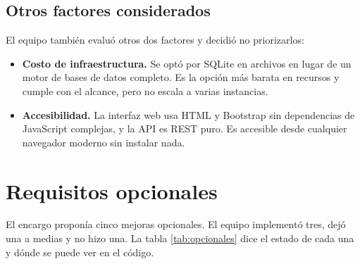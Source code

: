 \documentclass[12pt, a4paper]{article}
\begin{document}
\subsection{Otros factores considerados}

El equipo también evaluó otros dos factores y decidió no priorizarlos:

\begin{itemize}[leftmargin=1.4cm]
    \item \textbf{Costo de infraestructura.} Se optó por SQLite en
    archivos en lugar de un motor de bases de datos completo. Es la opción
    más barata en recursos y cumple con el alcance, pero no escala a
    varias instancias.
    \item \textbf{Accesibilidad.} La interfaz web usa HTML y Bootstrap sin
    dependencias de JavaScript complejas, y la API es REST puro. Es
    accesible desde cualquier navegador moderno sin instalar nada.
\end{itemize}


\newpage
\section{Requisitos opcionales}

El encargo proponía cinco mejoras opcionales. El equipo implementó tres,
dejó una a medias y no hizo una. La tabla \ref{tab:opcionales} dice el
estado de cada una y dónde se puede ver en el código.
\end{document}
